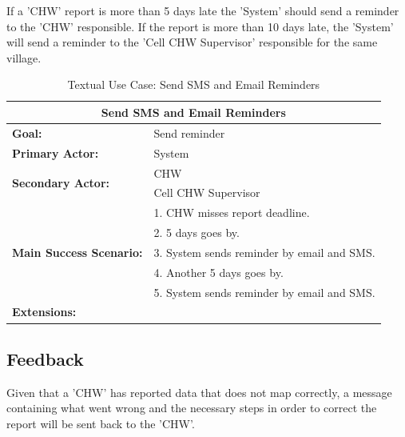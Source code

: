 \documentclass[a4paper, 11pt]{report}
\begin{document}
If a 'CHW' report is more than 5 days late the 'System' should send a reminder to the 'CHW' responsible. If the report is more than 10 days late, the 'System' will send a reminder to the 'Cell CHW Supervisor' responsible for the  same village.

\begin{table}[h]
	\centering
	\begin{tabular}{|l|l|}
		\hline
		\multicolumn{2}{|c|}{\textbf{Send SMS and Email Reminders}}\\
		\hline
		\textbf{Goal:} & Send reminder \\
		\hline
		\textbf{Primary Actor:} & System \\
		\hline
		\multirow{2}{*}{\textbf{Secondary Actor:}}	& CHW \\
																								& Cell CHW Supervisor \\
		\hline
		\multirow{5}{*}{\textbf{Main Success Scenario:}}	& 1. CHW misses report deadline. \\
																											& 2. 5 days goes by. \\
																											& 3. System sends reminder by email and SMS. \\
																											& 4. Another 5 days goes by. \\
																											& 5. System sends reminder by email and SMS. \\
																											
		\hline
		\textbf{Extensions:} & \\
		\hline
	\end{tabular}
	\caption{Textual Use Case: Send SMS and Email Reminders}
\end{table}
\pagebreak

\subsection{Feedback}

Given that a 'CHW' has reported data that does not map correctly, a message containing what went wrong and the necessary steps in order to correct the report will be sent back to the 'CHW'.
\end{document}
